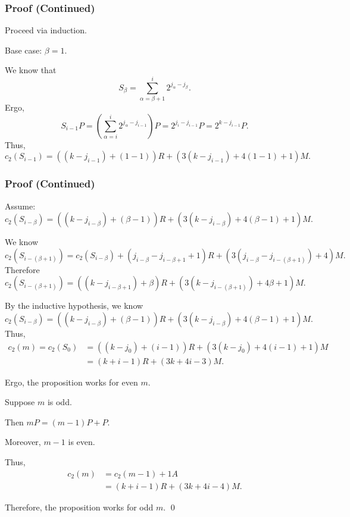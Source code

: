 \documentclass[xcolor=pdftex,dvipsnames,table]{beamer}
\theoremstyle{plain}
\theoremstyle{definition}
\newcommand{\paren}[1]{\left( #1 \right)}
\begin{document}
\begin{frame}
	\frametitle{Proof (Continued)}
	
	Proceed via induction.
	
	Base case: $\beta = 1$.
	
	We know that
	\[
	S_\beta = \sum_{\alpha=\beta+1}^{i} 2^{j_\alpha -j_\beta}.
	\]
	Ergo,
	\[
	S_{i-1}P=\paren{\sum_{\alpha=i}^i2^{j_{\alpha}-j_{i-1}}}P=2^{j_{i}-j_{i-1}}P=2^{k-j_{i-1}}P.
	\]
	Thus,
	\[
	c_2(S_{i-1})=( (k-j_{i-1})+ (1 -1) )R+(3( k-j_{i-1} )+4(1-1)+1 )M. 
	\]
\end{frame}

\begin{frame}
	\frametitle{Proof (Continued)}
	
	Assume:
	\[
	c_2(S_{i-\beta})=( (k-j_{i-\beta})+ (\beta -1) )R+(3( k-j_{i-\beta} )+4(\beta-1)+1 )M. 
	\]
	
	We know 
	\[
	c_2(S_{i-(\beta+1)})=c_2(S_{i-\beta})+ (j_{i-\beta}-j_{i-{\beta+1}}+1)R + (3(j_{i-\beta}-j_{i-(\beta+1)})+4)M.
	\]
	Therefore
	\[
	c_2(S_{i-(\beta+1)})=( (k-j_{i-{\beta+1}})+ \beta)R+(3( k-j_{i-(\beta+1)})+4\beta+1)M.
	\]
\end{frame}

\begin{frame}
	By the inductive hypothesis, we know
	\[
	c_2(S_{i-\beta})=( (k-j_{i-\beta})+ (\beta -1) )R+(3( k-j_{i-\beta} )+4(\beta-1)+1 )M. 
	\]
	Thus,
	\begin{align*}
	c_2(m)=c_2(S_{0})&=( (k-j_{0})+ (i -1) )R+(3( k-j_{0} )+4(i-1)+1 )M\\
	&=( k+ i -1 )R+(3 k+4i-3 )M.
	\end{align*}
	
	Ergo, the proposition works for even $m$.
\end{frame}

\begin{frame}
	Suppose $m$ is odd.
	
	Then $mP=(m-1)P+P$.
	
	Moreover, $m-1$ is even.
	
	Thus,
	\begin{align*}
	c_2(m)&=c_2(m-1)+1A\\
	&=( k+ i-1)R+(3 k+4i-4)M.
	\end{align*}
	
	Therefore, the proposition works for odd $m$. {\flushright\qed}
\end{frame}
\end{document}
